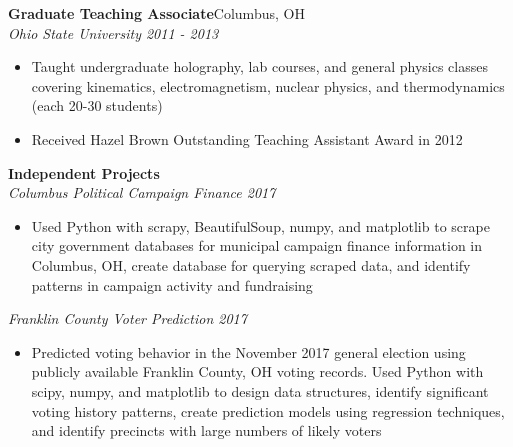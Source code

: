 \documentclass[line]{letter}
\begin{document}
\begin{addmargin}[1em]{1em}
{\large {\bf Graduate Teaching Associate}\hfill Columbus, OH\vspace{1mm}}\\
{\large \it Ohio State University \hfill 2011 - 2013} \\
\vspace{-7mm}
\begin{itemize}[leftmargin=5mm]
\item Taught undergraduate holography, lab courses, and general physics classes covering kinematics, electromagnetism, nuclear physics, and thermodynamics (each 20-30 students)
\item Received Hazel Brown Outstanding Teaching Assistant Award in 2012
\end{itemize}

{\large {\bf Independent Projects}\vspace{1mm}}\\
{\large \it Columbus Political Campaign Finance \hfill 2017} \\
\vspace{-7mm}
\begin{itemize}[leftmargin=5mm]
\item Used Python with scrapy, BeautifulSoup, numpy, and matplotlib to scrape city government databases for municipal campaign finance information in Columbus, OH, create database for querying scraped data, and identify patterns in campaign activity and fundraising 
\end{itemize}
\vspace{-1mm}
{\large \it Franklin County Voter Prediction \hfill 2017} \\
\vspace{-7mm}
\begin{itemize}[leftmargin=5mm]
\item Predicted voting behavior in the November 2017 general election using publicly available Franklin County, OH voting records. Used Python with scipy, numpy, and matplotlib to design data structures, identify significant voting history patterns, create prediction models using regression techniques, and identify precincts with large numbers of likely voters
\end{itemize}
\end{addmargin}

\end{document}
